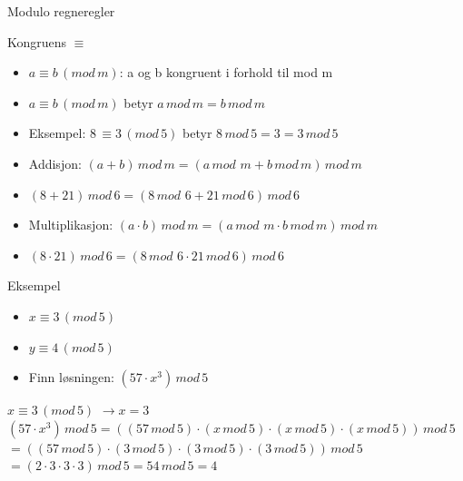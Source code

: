 \begin{frame}{Modulo regneregler}
\begin{block}{Kongruens $\equiv$}
\begin{itemize}
\item $a \equiv b\, (mod\, m)$: a og b kongruent i forhold til mod m
\item $a \equiv b\, (mod\, m)$ betyr $a\, mod\, m=b\, mod\, m$
\item Eksempel: $8\, \equiv 3\, (mod\, 5)$ betyr $8\, mod\, 5=3=3\, mod\, 5$ 
\end{itemize}
\end{block}
\pause
\begin{itemize}[<+->]
\item Addisjon: $(a+b)\, mod\, m = (a\,mod\, \,m + b\, mod\, m)\, mod\, m$
\item $(8+21)\, mod\, 6 = (8\,mod\, \,6 + 21\, mod\, 6)\, mod\, 6$
\item Multiplikasjon: $(a\cdot b)\, mod\, m = (a\,mod\, \,m \cdot b\, mod\, m)\, mod\, m$
\item $(8\cdot21)\, mod\, 6 = (8\,mod\, \,6 \cdot 21\, mod\, 6)\, mod\, 6$
\end{itemize}
\end{frame}

\begin{frame}{}
\begin{exampleblock}{Eksempel}
\begin{itemize}
\item $x \equiv 3\,(mod\, 5)$
\item $y \equiv 4\,(mod\, 5)$
\item Finn løsningen: $(57\cdot x^3)\, mod\,5$
\end{itemize}
\end{exampleblock}
\pause
\medskip

$x \equiv 3\,(mod\, 5)$ $\rightarrow x=3$\\
$(57\cdot x^3)\, mod\,5=((57\, mod\, 5)\cdot (x\, mod\, 5)\cdot (x\, mod\, 5)\cdot (x\, mod\, 5))\, mod\, 5$\\
$=((57\, mod\, 5)\cdot (3\, mod\, 5)\cdot (3\, mod\, 5)\cdot (3\, mod\, 5))\, mod\, 5$\\
$=(2\cdot 3\cdot 3\cdot 3)\, mod\, 5=54\, mod\, 5=4$
\end{frame}

